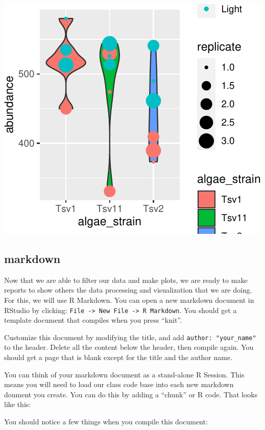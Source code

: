 \documentclass[
]{krantz}
\begin{document}
\begin{center}\includegraphics{index_files/figure-latex/unnamed-chunk-28-1} \end{center}

\hypertarget{markdown}{%
\subsection{markdown}\label{markdown}}

Now that we are able to filter our data and make plots, we are ready to make reports to show others the data processing and visualization that we are doing. For this, we will use R Markdown. You can open a new markdown document in RStudio by clicking: \texttt{File\ -\textgreater{}\ New\ File\ -\textgreater{}\ R\ Markdown}. You should get a template document that compiles when you press ``knit''.

Customize this document by modifying the title, and add \texttt{author:\ "your\_name"} to the header. Delete all the content below the header, then compile again. You should get a page that is blank except for the title and the author name.

You can think of your markdown document as a stand-alone R Session. This means you will need to load our class code base into each new markdown doument you create. You can do this by adding a ``chunk'' or R code. That looks like this:

You should notice a few things when you compile this document:
\end{document}

